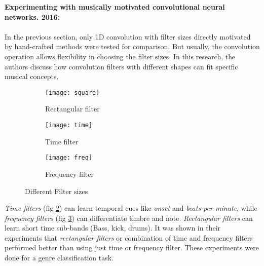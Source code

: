 \noindent \textbf{Experimenting with musically motivated convolutional neural networks. 2016\cite{MusicMotive}:}\\
\\
\noindent In the previous section, only 1D convolution with filter sizes directly motivated by hand-crafted methods were tested for comparison. But usually, the convolution operation allows flexibility in choosing the filter sizes. In this research, the authors discuss how convolution filters with different shapes can fit specific musical concepts. 
\begin{figure}[h]
       \begin{subfigure}[b]{0.3\textwidth}
        \texttt{[image: square]}
        \caption{Rectangular filter }
        \label{fig:square}
       \end{subfigure}
	    \begin{subfigure}[b]{0.3\textwidth}
        \texttt{[image: time]}
        \caption{
        Time filter
        }
        \label{fig:time}
       \end{subfigure}
       	    \begin{subfigure}[b]{0.3\textwidth}
        \texttt{[image: freq]}
        \caption{
        Frequency filter
        }
        \label{fig:freq}
       \end{subfigure}
       \caption{Different Filter sizes\cite{MusicMotive}}\label{fig:STFT}
\end{figure}
\FloatBarrier
\bigskip 
\noindent \textit{Time filters} (fig \ref{fig:time}) can learn temporal cues like \textit{onset} and \textit{beats per minute}, while \textit{frequency filters} (fig \ref{fig:freq}) can differentiate timbre and note. \textit{Rectangular filters} can learn short time sub-bands (Bass, kick, drums)\cite{MusicMotive}. It was shown in their experiments that \textit{rectangular filters} or combination of time and frequency filters performed better than using just time or frequency filter. These experiments were done for a genre classification task. 
\bigskip
 
